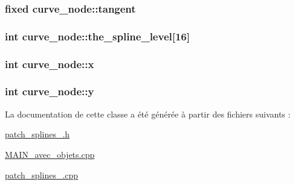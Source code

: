 \hypertarget{classcurve__node_a31ea7469070f7bb90ceae073d1d075a6}{
\subsubsection[{tangent}]{\setlength{\rightskip}{0pt plus 5cm}fixed curve\+\_\+node\+::tangent}}\label{classcurve__node_a31ea7469070f7bb90ceae073d1d075a6}
\hypertarget{classcurve__node_a62eb9b6b3a24274664775a07c565d39c}{
\subsubsection[{the\+\_\+spline\+\_\+level}]{\setlength{\rightskip}{0pt plus 5cm}int curve\+\_\+node\+::the\+\_\+spline\+\_\+level\mbox{[}16\mbox{]}\hspace{0.3cm}{\ttfamily [static]}}}\label{classcurve__node_a62eb9b6b3a24274664775a07c565d39c}
\hypertarget{classcurve__node_aa7ae8f2ee3bbd3e6194785c392751cdb}{
\subsubsection[{x}]{\setlength{\rightskip}{0pt plus 5cm}int curve\+\_\+node\+::x}}\label{classcurve__node_aa7ae8f2ee3bbd3e6194785c392751cdb}
\hypertarget{classcurve__node_afc1f4f007a920aa79c1f1f0ff0b49465}{
\subsubsection[{y}]{\setlength{\rightskip}{0pt plus 5cm}int curve\+\_\+node\+::y}}\label{classcurve__node_afc1f4f007a920aa79c1f1f0ff0b49465}


La documentation de cette classe a été générée à partir des fichiers suivants \+:\begin{DoxyCompactItemize}
\item 
\hyperlink{patch__splines__2_8h}{patch\+\_\+splines\+\_.\+h}\item 
\hyperlink{_m_a_i_n__avec__objets_8cpp}{M\+A\+I\+N\+\_\+avec\+\_\+objets.\+cpp}\item 
\hyperlink{patch__splines__2_8cpp}{patch\+\_\+splines\+\_.\+cpp}\end{DoxyCompactItemize}
